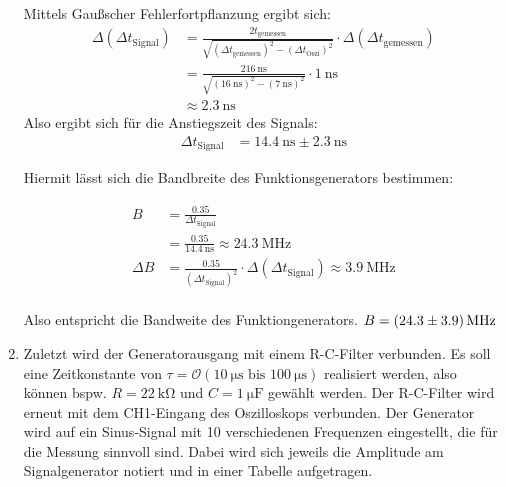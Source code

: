 \documentclass{article}
\begin{document}
\begin{enumerate}[label=\alph*]
         Mittels Gaußscher Fehlerfortpflanzung ergibt sich:
         \begin{align*}
             \Delta(\Delta t_\mathrm{Signal}) &= \frac{2 t_\mathrm{gemessen}}{\sqrt{(\Delta t_\mathrm{gemessen})^2 - (\Delta t_\mathrm{Oszi})^2}} \cdot \Delta(\Delta t_\mathrm{gemessen}) \\
             &= \frac{2 \SI{16}{\nano\second}}{\sqrt{(\SI{16}{\nano\second})^2 - (\SI{7}{\nano\second})^2}} \cdot \SI{1}{\nano\second} \\
             &\approx \SI{2.3}{\nano\second}
         \end{align*}
         Also ergibt sich für die Anstiegszeit des Signals:
         \begin{align*}
             \Delta t_\mathrm{Signal} &= \SI{14.4}{\nano\second} \pm \SI{2.3}{\nano\second}
         \end{align*}

         Hiermit lässt sich die Bandbreite des Funktionsgenerators bestimmen:
        
        \begin{align*}
            B &=
            \frac{0.35}{\Delta t_\mathrm{Signal}}\\
            &=\frac{0.35}{\SI{14.4}{\nano\second}} \approx \SI{24.3}{\mega\hertz}\\
            \Delta B &= \frac{0.35}{(\Delta t_\mathrm{Signal})^2} \cdot \Delta (\Delta t_\mathrm{Signal})\approx \SI{3.9}{\mega\hertz}\\
        \end{align*}
        
        Also entspricht die Bandweite des Funktiongenerators. $B = \SI{24.3 \pm 3.9}{\mega\hertz} $

         \item Zuletzt wird der Generatorausgang mit einem R-C-Filter verbunden. Es soll eine 
         Zeitkonstante von $\tau = \mathcal{O}(\SI{10}{\micro\second} \text{ bis } \SI{100}{\micro\second})$ realisiert werden, also können 
         bspw. $R = \SI{22}{\kilo\ohm}$ und $C = \SI{1}{\micro\farad}$ gewählt werden. 
         Der R-C-Filter wird erneut mit dem CH1-Eingang des Oszilloskops verbunden. 
         Der Generator wird auf ein Sinus-Signal mit 10 verschiedenen Frequenzen eingestellt, die 
         für die Messung sinnvoll sind.  
         Dabei wird sich jeweils die Amplitude am Signalgenerator notiert und in einer Tabelle aufgetragen. 


\end{enumerate}
\end{document}
